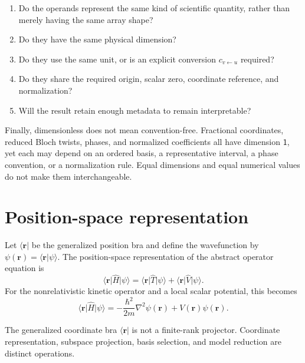 \begin{enumerate}
  \item Do the operands represent the same kind of scientific quantity, rather
        than merely having the same array shape?
  \item Do they have the same physical dimension?
  \item Do they use the same unit, or is an explicit conversion
        \(c_{v\leftarrow u}\) required?
  \item Do they share the required origin, scalar zero, coordinate reference,
        and normalization?
  \item Will the result retain enough metadata to remain interpretable?
\end{enumerate}

Finally, dimensionless does not mean convention-free. Fractional coordinates,
reduced Bloch twists, phases, and normalized coefficients all have dimension
\(\mathsf 1\), yet each may depend on an ordered basis, a representative
interval, a phase convention, or a normalization rule. Equal dimensions and
equal numerical values do not make them interchangeable.

\section{Position-space representation}

Let \(\langle\mathbf r\rvert\) be the generalized position bra and define the
wavefunction by
\(\psi(\mathbf r)=\langle\mathbf r\vert\psi\rangle\). The position-space
representation of the abstract operator equation is
\begin{equation}
  \langle\mathbf r\rvert\hat H\lvert\psi\rangle
  =\langle\mathbf r\rvert\hat T\lvert\psi\rangle
  +\langle\mathbf r\rvert\hat V\lvert\psi\rangle.
\end{equation}
For the nonrelativistic kinetic operator and a local scalar potential, this
becomes
\begin{equation}
  \langle\mathbf r\rvert\hat H\lvert\psi\rangle
  =-\frac{\hbar^{2}}{2m}\nabla^{2}\psi(\mathbf r)
  +V(\mathbf r)\psi(\mathbf r).
\end{equation}

The generalized coordinate bra \(\langle\mathbf r\rvert\) is not a finite-rank
projector. Coordinate representation, subspace projection, basis selection,
and model reduction are distinct operations.

